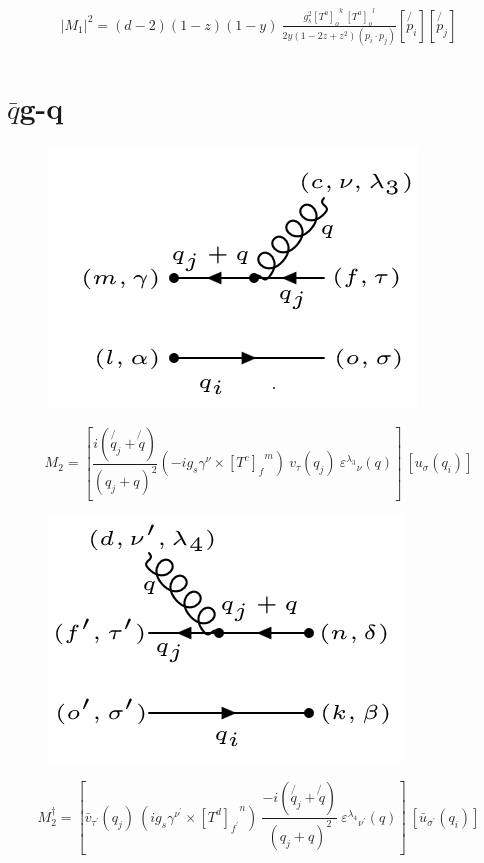 \begin{equation}
\begin{split}
|M_1|^2=(d-2)(1-z)(1-y)\:\frac{g_s^2  {[T^a]_{o}}^k \: {[T^a]_o}^l }{2y(1-2z+z^2)(p_i \cdot p_j)}
[\not{p_i}][\not{p_j}]
\end{split}
\end{equation}
\newpage

\section{$\bar{q}$g-q}

\begin{figure}[h!]
\centering
\includegraphics[scale=0.7]{images/qbargqM.png}
\end{figure}

\begin{equation}
M_2 = [\frac{i(\not{q_j} + \not{q})}{(q_j + q)^2} (-ig_s \gamma^{\nu}\times {[T^c]_f}^m) \:{v}_{\tau}(q_j)\: {\varepsilon^{\lambda_3}}_{\nu} (q)]\: [{u}_{\sigma}(q_i)]
\end{equation}
\begin{figure}[h!]
\centering
\includegraphics[scale=0.7]{images/qbargqMDega.png}
\end{figure}
\begin{equation}
M_2^{\dagger} = [\bar{v}_{{\tau}^{\prime}}(q_j) \: (ig_s \gamma^{{\nu}^{\prime}}\times {[T^d]_{f^{\prime}}}^n) \: \frac{-i(\not{q_j} + \not{q})}{(q_j + q)^2} \: {\varepsilon^{\lambda_4}}_{{\nu}^{\prime}} (q)]\: [\bar{u}_{{\sigma}^{\prime}}(q_i)]
\end{equation}

